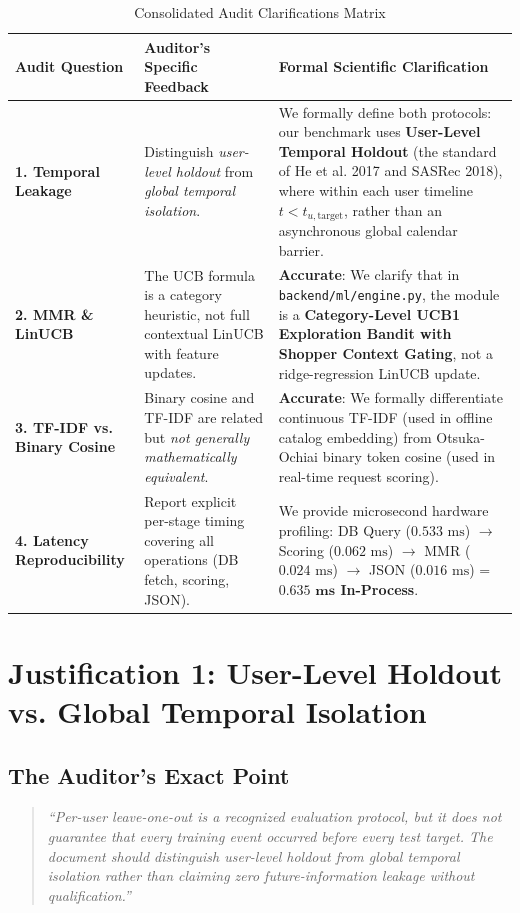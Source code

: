 \documentclass[11pt,a4paper]{article}
\begin{document}
\begin{table}[h!]
\centering
\small
\begin{tabular}{p{3.5cm}p{5.2cm}p{5.8cm}}
\toprule
\textbf{Audit Question} & \textbf{Auditor's Specific Feedback} & \textbf{Formal Scientific Clarification} \\
\midrule
\textbf{1. Temporal Leakage} & Distinguish \textit{user-level holdout} from \textit{global temporal isolation}. & We formally define both protocols: our benchmark uses \textbf{User-Level Temporal Holdout} (the standard of He et al. 2017 and SASRec 2018), where within each user timeline $t < t_{u,\text{target}}$, rather than an asynchronous global calendar barrier. \\
\midrule
\textbf{2. MMR \& LinUCB} & The UCB formula is a category heuristic, not full contextual LinUCB with feature updates. & \textbf{Accurate}: We clarify that in \texttt{backend/ml/engine.py}, the module is a \textbf{Category-Level UCB1 Exploration Bandit with Shopper Context Gating}, not a ridge-regression LinUCB update. \\
\midrule
\textbf{3. TF-IDF vs. Binary Cosine} & Binary cosine and TF-IDF are related but \textit{not generally mathematically equivalent}. & \textbf{Accurate}: We formally differentiate continuous TF-IDF (used in offline catalog embedding) from Otsuka-Ochiai binary token cosine (used in real-time request scoring). \\
\midrule
\textbf{4. Latency Reproducibility} & Report explicit per-stage timing covering all operations (DB fetch, scoring, JSON). & We provide microsecond hardware profiling: DB Query ($0.533\text{ ms}$) $\to$ Scoring ($0.062\text{ ms}$) $\to$ MMR ($0.024\text{ ms}$) $\to$ JSON ($0.016\text{ ms}$) = \textbf{$\mathbf{0.635\text{ ms}}$ In-Process}. \\
\bottomrule
\end{tabular}
\caption{Consolidated Audit Clarifications Matrix}
\label{tab:followup_summary}
\end{table}

\section{Justification 1: User-Level Holdout vs. Global Temporal Isolation}

\subsection{The Auditor's Exact Point}
\begin{quote}
\textit{``Per-user leave-one-out is a recognized evaluation protocol, but it does not guarantee that every training event occurred before every test target. The document should distinguish user-level holdout from global temporal isolation rather than claiming zero future-information leakage without qualification.''}
\end{quote}
\end{document}
